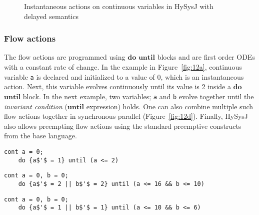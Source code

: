 \documentclass[10pt,journal,cspaper,compsoc]{IEEEtran}
\begin{document}
\begin{figure}[t!]
  \centering
  
  \caption{Instantaneous actions on continuous variables in HySysJ with
    delayed semantics}
  \label{fig:16}
\end{figure}

\subsubsection{Flow actions}
\label{sec:flow-actions}

The flow actions are programmed using $\mathbf{do}$ $\mathbf{until}$
blocks and are first order ODEs with a constant rate of change. In the
example in Figure~\ref{fig:12a}, continuous variable \texttt{a} is
declared and initialized to a value of 0, which is an instantaneous
action. Next, this variable evolves continuously until its value is 2
inside a $\mathbf{do}$ $\mathbf{until}$ block. In the next example, two
variables; \texttt{a} and \texttt{b} evolve together until the
\textit{invariant condition} ($\mathbf{until}$ expression) holds. One
can also combine multiple such flow actions together in synchronous
parallel (Figure~\ref{fig:12d}). Finally, HySysJ also allows preempting flow actions using the standard
preemptive constructs from the base language.

\newbox{\clf}
\begin{lrbox}{\clf}
  \begin{lstlisting}[mathescape,style=sysj,morekeywords={until,cont,signal,loop,abort,await,emit,present,trap,pause,exit,delay,suspend}]
    cont a = 0;
    do {a$'$ = 1} until (a <= 2) 
  \end{lstlisting}
\end{lrbox}

\newbox{\cls}
\begin{lrbox}{\cls}
  \begin{lstlisting}[mathescape,style=sysj,morekeywords={until,cont,signal,loop,abort,await,emit,present,trap,pause,exit,delay,suspend}]
    cont a = 0, b = 0; 
    do {a$'$ = 2 || b$'$ = 2} until (a <= 16 && b <= 10)
  \end{lstlisting}
\end{lrbox}

\newbox{\clfi}
\begin{lrbox}{\clfi}
  \begin{lstlisting}[mathescape,style=sysj,morekeywords={until,cont,signal,loop,abort,await,emit,present,trap,pause,exit,delay,suspend}]
    cont a = 0, b = 0;
    do {a$'$ = 1 || b$'$ = 1} until (a <= 10 && b <= 6)
  \end{lstlisting}
\end{lrbox}
\end{document}
